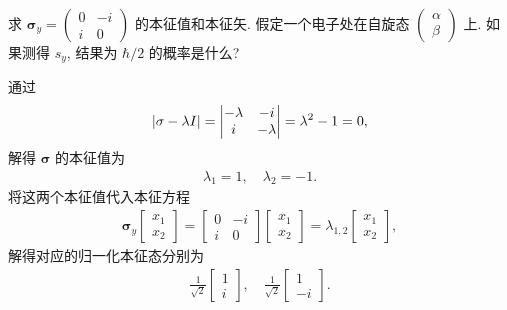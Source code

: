 \documentclass{assignment}
\begin{document}
\begin{prob}[课本习题 3.1]
    求 $\bm{\sigma}_y=\begin{pmatrix}
        0&-i\\
        i&0
    \end{pmatrix}$ 的本征值和本征矢. 假定一个电子处在自旋态 $\begin{pmatrix}
        \alpha\\
        \beta
    \end{pmatrix}$ 上. 如果测得 $s_y$, 结果为 $\hbar/2$ 的概率是什么?
\end{prob}
\begin{sol}
    通过
    \begin{align}
        \left\lvert\sigma-\lambda I\right\rvert=\begin{vmatrix}
            -\lambda&-i\\
            i&-\lambda
        \end{vmatrix}=\lambda^2-1=0,
    \end{align}
    解得 $\bm{\sigma}$ 的本征值为
    \begin{align}
        \lambda_1=1,\quad\lambda_2=-1.
    \end{align}
    将这两个本征值代入本征方程
    \begin{align}
        \bm{\sigma}_y\begin{bmatrix}
            x_1\\
            x_2
        \end{bmatrix}=\begin{bmatrix}
            0&-i\\
            i&0
        \end{bmatrix}\begin{bmatrix}
            x_1\\
            x_2
        \end{bmatrix}=\lambda_{1,2}\begin{bmatrix}
            x_1\\
            x_2
        \end{bmatrix},
    \end{align}
    解得对应的归一化本征态分别为
    \begin{align}
        \frac{1}{\sqrt{2}}\begin{bmatrix}
            1\\
            i
        \end{bmatrix},\quad\frac{1}{\sqrt{2}}\begin{bmatrix}
            1\\
            -i
        \end{bmatrix}.
    \end{align}


\end{sol}
\end{document}
